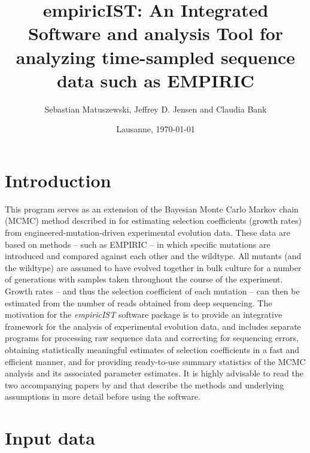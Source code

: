 \documentclass[12pt,a4paper]{scrartcl}
\begin{document}
 \titlehead{empiricIST: An Integrated Software and analysis Tool for analyzing time-sampled sequence data such as EMPIRIC}
  \subject{README}
  \title{empiricIST: An Integrated Software and analysis Tool for analyzing time-sampled sequence data such as EMPIRIC}
  \author{Sebastian Matuszewski, Jeffrey D. Jensen and Claudia Bank}
  \date{Lausanne, \today}
\begingroup
 \makeatletter
 \@titlepagetrue
 \maketitle
\endgroup
\newpage
\tableofcontents
\newpage

\section{Introduction}


This program serves as an extension of the Bayesian Monte Carlo Markov chain (MCMC) method described in \cite{BanHW14} for estimating selection coefficients (growth rates) from engineered-mutation-driven experimental evolution data. These data are based on methods -- such as EMPIRIC -- in which specific mutations are introduced and compared against each other and the wildtype. All mutants (and the wildtype) are assumed to have evolved together in bulk culture for a number of generations with samples taken throughout the course of the experiment. Growth rates -- and thus the selection coefficient of each mutation -- can then be estimated from the number of reads obtained from deep sequencing.
The motivation for the \emph{empiricIST} software package is to provide an integrative framework for the analysis of experimental evolution data, and includes separate programs for processing raw sequence data and correcting for sequencing errors, obtaining statistically meaningful estimates of selection coefficients in a fast and efficient manner, and for providing ready-to-use summary statistics of the MCMC analysis and its associated parameter estimates.
It is highly advisable to read the two accompanying papers by \cite{BanHW14} and \cite{MatJB15} that describe the methods and underlying assumptions in more detail before using the software.

\section{Input data}
\end{document}
